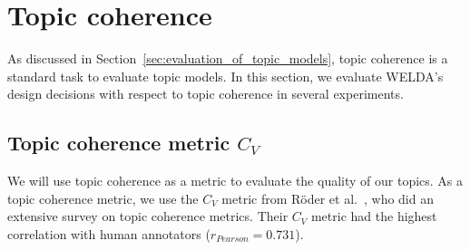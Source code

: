 \documentclass[
        a4paper,
        titlepage,
        twoside,
        parskip
        ]{scrbook}
\theoremstyle{break}
\begin{document}
\section{Topic coherence}
\label{sec:topic_coherence}
As discussed in Section~\ref{sec:evaluation_of_topic_models}, topic coherence is a standard task to evaluate topic models.
In this section, we evaluate WELDA's design decisions with respect to topic coherence in several experiments.
\subsection{Topic coherence metric $C_V$}

We will use topic coherence as a metric to evaluate the quality of our topics.
As a topic coherence metric, we use the $C_V$ metric from Röder et al.~\cite{Roder2015}, who did an extensive survey on topic coherence metrics.
Their $C_V$ metric had the highest correlation with human annotators ($r_{Pearson} = 0.731$).
\end{document}
